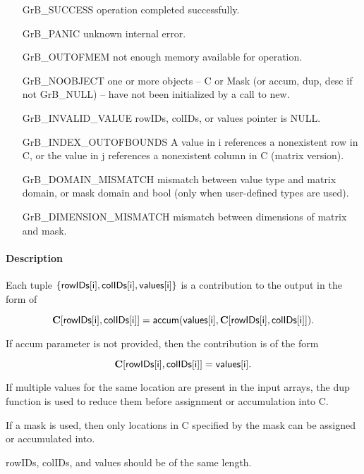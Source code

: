 \begin{itemize}[leftmargin=2.1in]
\item[{\sf GrB\_SUCCESS}]      operation completed successfully.
\item[{\sf GrB\_PANIC}]        unknown internal error.
\item[{\sf GrB\_OUTOFMEM}]     not enough memory available for operation.
\item[{\sf GrB\_NOOBJECT}]     one or more objects -- {\sf C} or {\sf Mask} (or {\sf accum}, {\sf dup}, {\sf desc} if not {\sf GrB\_NULL}) -- have not been initialized by a call to {\sf new}.
\item[{\sf GrB\_INVALID\_VALUE}]  {\sf rowIDs}, {\sf colIDs}, or {\sf values} pointer is {\sf NULL}.
\item[{\sf GrB\_INDEX\_OUTOFBOUNDS}]
        A value in i references a nonexistent row in C, or
        the value in j references a nonexistent column in C (matrix version).
\item[\sf GrB\_DOMAIN\_MISMATCH]  
       mismatch between value type and matrix domain, or mask domain and {\sf bool} (only when user-defined types are used).
\item[\sf GrB\_DIMENSION\_MISMATCH]  
                       mismatch between dimensions of matrix and mask. 
\end{itemize}


\paragraph{Description}
Each tuple $\{ {\sf rowIDs[i]}, {\sf colIDs[i]}, {\sf values[i]}\}$ is a contribution to the output in the form of 

$${\bf C}[{\sf rowIDs[i]},{\sf colIDs[i]}] = {\sf accum}({\sf values[i]}, {\bf C}[{\sf rowIDs[i]}, {\sf colIDs[i]}]).$$

If {\sf accum} parameter is not provided, then the contribution is of the form 

$${\bf C}[{\sf rowIDs[i]}, {\sf colIDs[i]}] = {\sf values[i]}.$$

If multiple values for the same location are present in the input arrays, the 
dup function is used to reduce them before assignment or accumulation into {\sf C}.

If a mask is used, then only locations in {\sf C} specified by the mask can be 
assigned or accumulated into.

 
{\sf rowIDs}, {\sf colIDs}, and {\sf values} should be of the same length. 

